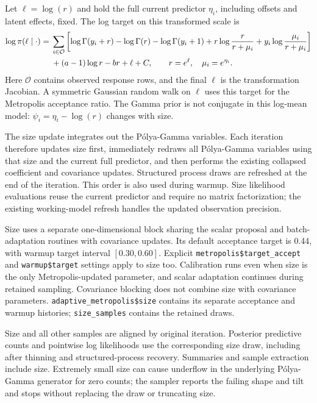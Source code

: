 \documentclass[11pt]{article}
\begin{document}
Let $\ell=\log(r)$ and hold the full current predictor $\eta_i$, including offsets and latent effects, fixed. The log target on this transformed scale is
\begin{align}
 \log\pi(\ell\mid\cdot) ={}& \sum_{i\in\mathcal O}\left[
  \log\Gamma(y_i+r)-\log\Gamma(r)-\log\Gamma(y_i+1)
  +r\log\frac{r}{r+\mu_i}+y_i\log\frac{\mu_i}{r+\mu_i}\right] \notag\\
 &+(a-1)\log r-br+\ell+C,\qquad r=e^\ell,\quad\mu_i=e^{\eta_i}.
\end{align}
Here $\mathcal O$ contains observed response rows, and the final $\ell$ is the transformation Jacobian. A symmetric Gaussian random walk on $\ell$ uses this target for the Metropolis acceptance ratio. The Gamma prior is not conjugate in this log-mean model: $\psi_i=\eta_i-\log(r)$ changes with size.

The size update integrates out the P{\'o}lya-Gamma variables. Each iteration therefore updates size first, immediately redraws all P{\'o}lya-Gamma variables using that size and the current full predictor, and then performs the existing collapsed coefficient and covariance updates. Structured process draws are refreshed at the end of the iteration. This order is also used during warmup. Size likelihood evaluations reuse the current predictor and require no matrix factorization; the existing working-model refresh handles the updated observation precision.

Size uses a separate one-dimensional block sharing the scalar proposal and batch-adaptation routines with covariance updates. Its default acceptance target is 0.44, with warmup target interval $[0.30,0.60]$. Explicit \texttt{metropolis\$target\_accept} and \texttt{warmup\$target} settings apply to size too. Calibration runs even when size is the only Metropolis-updated parameter, and scalar adaptation continues during retained sampling. Covariance blocking does not combine size with covariance parameters. \texttt{adaptive\_metropolis\$size} contains its separate acceptance and warmup histories; \texttt{size\_samples} contains the retained draws.

Size and all other samples are aligned by original iteration. Posterior predictive counts and pointwise log likelihoods use the corresponding size draw, including after thinning and structured-process recovery. Summaries and sample extraction include size. Extremely small size can cause underflow in the underlying P{\'o}lya-Gamma generator for zero counts; the sampler reports the failing shape and tilt and stops without replacing the draw or truncating size.
\end{document}
